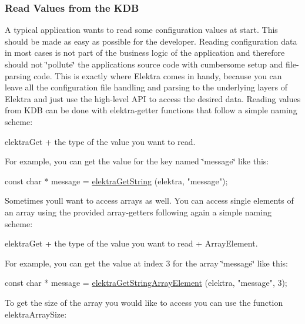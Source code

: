 \label{_read-values-from-the-kdb}%


\subsubsection*{Read Values from the K\+DB}

A typical application wants to read some configuration values at start. This should be made as easy as possible for the developer. Reading configuration data in most cases is not part of the business logic of the application and therefore should not \char`\"{}pollute\char`\"{} the applications source code with cumbersome setup and file-\/parsing code. This is exactly where Elektra comes in handy, because you can leave all the configuration file handling and parsing to the underlying layers of Elektra and just use the high-\/level A\+PI to access the desired data. Reading values from K\+DB can be done with elektra-\/getter functions that follow a simple naming scheme\+:

{\ttfamily elektra\+Get} + the type of the value you want to read.

For example, you can get the value for the key named \char`\"{}message\char`\"{} like this\+:


\begin{DoxyCode}
\textcolor{keyword}{const} \textcolor{keywordtype}{char} * message = \hyperlink{group__highlevel_ga08df058ca39c5ac17c26924d301bb742}{elektraGetString} (elektra, \textcolor{stringliteral}{"message"});
\end{DoxyCode}


Sometimes you\textquotesingle{}ll want to access arrays as well. You can access single elements of an array using the provided array-\/getters following again a simple naming scheme\+:

{\ttfamily elektra\+Get} + the type of the value you want to read + {\ttfamily Array\+Element}.

For example, you can get the value at index 3 for the array \char`\"{}message\char`\"{} like this\+:


\begin{DoxyCode}
\textcolor{keyword}{const} \textcolor{keywordtype}{char} * message = \hyperlink{group__highlevel_gaf445216facccfc7ad6740b594e7a8f6e}{elektraGetStringArrayElement} (elektra, \textcolor{stringliteral}{"message"}, 3);
\end{DoxyCode}


To get the size of the array you would like to access you can use the function {\ttfamily elektra\+Array\+Size}\+:


